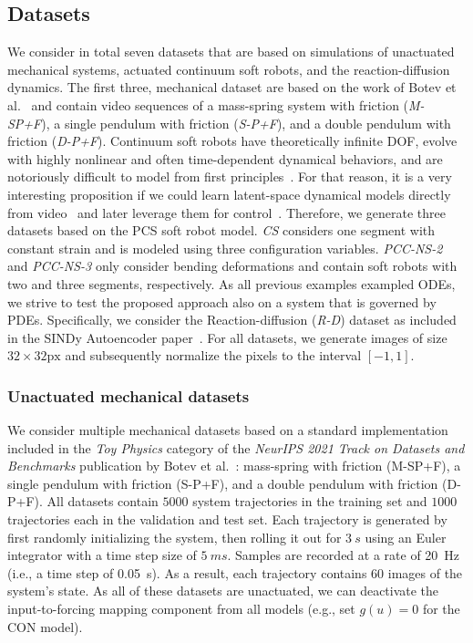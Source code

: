 \subsection{Datasets} 
We consider in total seven datasets that are based on simulations of unactuated mechanical systems, actuated continuum soft robots, and the reaction-diffusion dynamics. The first three, mechanical dataset are based on the work of Botev et al.~\citep{botev2021priors} and contain video sequences of a mass-spring system with friction (\emph{M-SP+F}), a single pendulum with friction (\emph{S-P+F}), and a double pendulum with friction (\emph{D-P+F}).
Continuum soft robots have theoretically infinite \gls{DOF}, evolve with highly nonlinear and often time-dependent dynamical behaviors, and are notoriously difficult to model from first principles~\citep{armanini2023soft}. For that reason, it is a very interesting proposition if we could learn latent-space dynamical models directly from video~\citep{thuruthel2023multi} and later leverage them for control~\citep{almanzor2023static}. 
Therefore, we generate three datasets based on the \gls{PCS} soft robot model. \emph{CS} considers one segment with constant strain and is modeled using three configuration variables. \emph{PCC-NS-2} and \emph{PCC-NS-3} only consider bending deformations and contain soft robots with two and three segments, respectively. 
As all previous examples exampled \glspl{ODE}, we strive to test the proposed approach also on a system that is governed by \glspl{PDE}. Specifically, we consider the Reaction-diffusion (\emph{R-D}) dataset as included in the SINDy Autoencoder paper~\citep{champion2019data}.
For all datasets, we generate images of size $32 \times 32 \mathrm{px}$ and subsequently normalize the pixels to the interval $[-1, 1]$. 

\subsubsection{Unactuated mechanical datasets}
We consider multiple mechanical datasets based on a standard implementation included in the \emph{Toy Physics} category of the \emph{NeurIPS 2021 Track on Datasets and Benchmarks} publication by Botev et al.~\citep{botev2021priors}:  mass-spring with friction (M-SP+F), a single pendulum with friction (S-P+F), and a double pendulum with friction (D-P+F).
All datasets contain $5000$ system trajectories in the training set and $1000$ trajectories each in the validation and test set.
Each trajectory is generated by first randomly initializing the system, then rolling it out for $\SI{3}{s}$ using an Euler integrator with a time step size of $\SI{5}{ms}$. Samples are recorded at a rate of \SI{20}{Hz}  (i.e., a time step of \SI{0.05}{s}). As a result, each trajectory contains $60$ images of the system's state.
As all of these datasets are unactuated, we can deactivate the input-to-forcing mapping component from all models (e.g., set $g(u) = 0$ for the \gls{CON} model).

